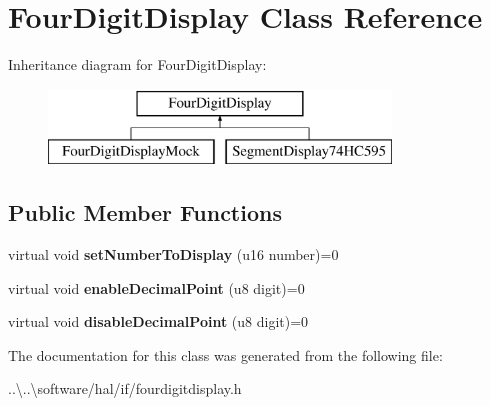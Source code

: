 \hypertarget{class_four_digit_display}{}\section{Four\+Digit\+Display Class Reference}
\label{class_four_digit_display}
Inheritance diagram for Four\+Digit\+Display\+:\begin{figure}[H]
\begin{center}
\leavevmode
\includegraphics[height=2.000000cm]{class_four_digit_display}
\end{center}
\end{figure}
\subsection*{Public Member Functions}
\begin{DoxyCompactItemize}
\item 
\mbox{\label{class_four_digit_display_a32ca43d20e2253ff51a1b23700c4cb13}} 
virtual void {\bfseries set\+Number\+To\+Display} (u16 number)=0
\item 
\mbox{\label{class_four_digit_display_af6258c4601f0f028025a7a0c4905b79b}} 
virtual void {\bfseries enable\+Decimal\+Point} (u8 digit)=0
\item 
\mbox{\label{class_four_digit_display_ac06686283c5486b98f95c32603b15662}} 
virtual void {\bfseries disable\+Decimal\+Point} (u8 digit)=0
\end{DoxyCompactItemize}


The documentation for this class was generated from the following file\+:\begin{DoxyCompactItemize}
\item 
..\textbackslash{}..\textbackslash{}software/hal/if/fourdigitdisplay.\+h\end{DoxyCompactItemize}
